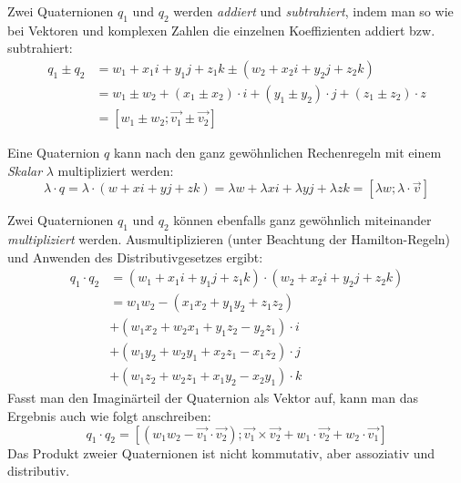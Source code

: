 Zwei Quaternionen $q_1$ und $q_2$ werden \emph{addiert} und \emph{subtrahiert}, indem man so wie bei Vektoren und komplexen Zahlen die einzelnen Koeffizienten addiert bzw. subtrahiert:
\begin{equation}
\begin{split}
 q_1 \pm q_2 &= w_1 + x_{1}i + y_{1}j + z_{1}k \pm \left( w_2 + x_{2}i + y_{2}j + z_{2}k \right) \\
 &= w_1 \pm w_2 + \left( x_1 \pm x_2 \right) \cdot i + \left( y_1 \pm y_2 \right) \cdot j + \left( z_1 \pm z_2 \right) \cdot z \\
 &= \left[ w_1 \pm w_2; \vec{v_1} \pm \vec{v_2} \right]
\end{split}
\end{equation}

Eine Quaternion $q$ kann nach den ganz gewöhnlichen Rechenregeln mit einem \emph{Skalar} $\lambda$ multipliziert werden:
\begin{equation}
 \lambda \cdot q = \lambda \cdot (w + xi + yj + zk) = \lambda w + \lambda xi + \lambda yj + \lambda zk = \left[ \lambda w; \lambda \cdot \vec v \right]
\end{equation}

Zwei Quaternionen $q_1$ und $q_2$ können ebenfalls ganz gewöhnlich miteinander \emph{multipliziert} werden. Ausmultiplizieren (unter Beachtung der Hamilton-Regeln) und Anwenden des Distributivgesetzes ergibt:
\begin{equation}
\begin{split}
 q_1 \cdot q_2 &= ( w_1 + x_{1}i + y_{1}j + z_{1}k ) \cdot ( w_2 + x_{2}i + y_{2}j + z_{2}k ) \\
 &= w_1 w_2 - ( x_1 x_2 + y_1 y_2 + z_1 z_2 ) \\
    & + ( w_1 x_2 + w_2 x_1 + y_1 z_2 - y_2 z_1 ) \cdot i \\
    & + ( w_1 y_2 + w_2 y_1 + x_2 z_1 - x_1 z_2 ) \cdot j \\
    & + ( w_1 z_2 + w_2 z_1 + x_1 y_2 - x_2 y_1 ) \cdot k
\end{split}
\end{equation}
Fasst man den Imaginärteil der Quaternion als Vektor auf, kann man das Ergebnis auch wie folgt anschreiben:
\begin{equation}
 \label{quaternionmultiplicationvector}
 q_1 \cdot q_2 = \left[ \left( w_1 w_2 - \vec{v_1} \cdot \vec{v_2} \right); \vec{v_1} \times \vec{v_2} + w_1 \cdot \vec{v_2} + w_2 \cdot \vec{v_1} \right]
\end{equation}
Das Produkt zweier Quaternionen ist nicht kommutativ, aber assoziativ und distributiv.

